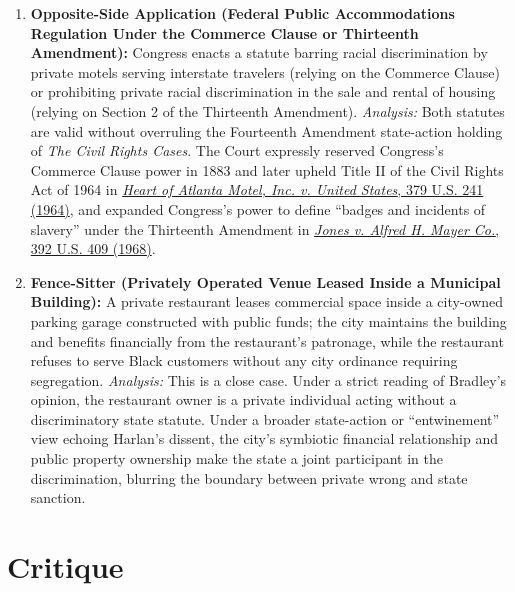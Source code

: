 \documentclass[12pt]{article}
\begin{document}
\begin{enumerate}
\item \textbf{Opposite-Side Application (Federal Public Accommodations Regulation Under the Commerce Clause or Thirteenth Amendment):} Congress enacts a statute barring racial discrimination by private motels serving interstate travelers (relying on the Commerce Clause) or prohibiting private racial discrimination in the sale and rental of housing (relying on Section 2 of the Thirteenth Amendment). \textit{Analysis:} Both statutes are valid without overruling the Fourteenth Amendment state-action holding of \textit{The Civil Rights Cases}. The Court expressly reserved Congress's Commerce Clause power in 1883 and later upheld Title II of the Civil Rights Act of 1964 in \href{https://supreme.justia.com/cases/federal/us/379/241/}{\textit{Heart of Atlanta Motel, Inc. v. United States}, 379 U.S. 241 (1964)}, and expanded Congress's power to define ``badges and incidents of slavery'' under the Thirteenth Amendment in \href{https://supreme.justia.com/cases/federal/us/392/409/}{\textit{Jones v. Alfred H. Mayer Co.}, 392 U.S. 409 (1968)}.

\item \textbf{Fence-Sitter (Privately Operated Venue Leased Inside a Municipal Building):} A private restaurant leases commercial space inside a city-owned parking garage constructed with public funds; the city maintains the building and benefits financially from the restaurant's patronage, while the restaurant refuses to serve Black customers without any city ordinance requiring segregation. \textit{Analysis:} This is a close case. Under a strict reading of Bradley's opinion, the restaurant owner is a private individual acting without a discriminatory state statute. Under a broader state-action or ``entwinement'' view echoing Harlan's dissent, the city's symbiotic financial relationship and public property ownership make the state a joint participant in the discrimination, blurring the boundary between private wrong and state sanction.
\end{enumerate}

\section{Critique}
\end{document}
